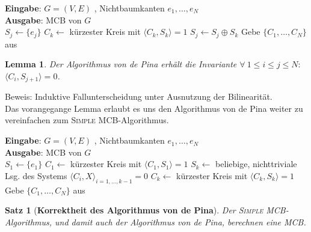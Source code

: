 \documentclass[a4paper,10pt]{scrartcl}
\newcommand{\tbf}{\textbf}
\newcommand{\tsc}{\textsc}
\newcommand{\agn}{\leftarrow}
\newcommand{\Gr}{$G = (V,E)$ }
\newcommand{\Eingabe}[1]{\STATE \tbf{Eingabe}: #1 \\}
\newcommand{\Ausgabe}[1]{\STATE \tbf{Ausgabe}: #1 \\}
\newtheorem{satz}{Satz}
\newtheorem{lemma}{Lemma}
\begin{document}
\begin{algorithm}
\caption{Algorithmus von \textsf{de Pina} algebraisch}
\begin{algorithmic}
\Eingabe{\Gr, Nichtbaumkanten $e_1, \ldots, e_N$}
\Ausgabe{MCB von $G$}
	\STATE $S_j \agn \{e_j\}$
\ENDFOR
{}
	\STATE $C_k \agn$ kürzester Kreis mit $\langle C_k, S_k \rangle = 1$
			\STATE $S_j \agn S_j \oplus S_k$
		\ENDIF
	\ENDFOR
\ENDFOR
\STATE Gebe $\{C_1, \ldots, C_N\}$ aus
\end{algorithmic}
\end{algorithm}

\begin{lemma}\label{PinaInvariante}
 Der Algorithmus von \textsf{de Pina} erhält die Invariante $\forall \ 1 \leq i \leq j \leq N:$ $\langle C_i,S_{j+1} \rangle = 0$.
\end{lemma}

Beweis: Induktive Fallunterscheidung unter Ausnutzung der Bilinearität. \\

Das vorangegange Lemma erlaubt es uns den Algorithmus von \textsf{de Pina} weiter zu vereinfachen zum \tsc{Simple MCB}-Algorithmus. \\

\begin{algorithm}
\caption{\tsc{Simple MCB}}
\begin{algorithmic}
\Eingabe{\Gr, Nichtbaumkanten $e_1, \ldots, e_N$}
\Ausgabe{MCB von $G$}
\STATE $S_1 \agn \{e_1\}$
\STATE $C_1 \agn$ kürzester Kreis mit $\langle C_1, S_1 \rangle = 1$
	\STATE $S_k \agn$ beliebige, nichttriviale Lsg. des Systems $\langle C_i, X \rangle_{i=1,\ldots,k-1} = 0$
	\STATE $C_k \agn$ kürzester Kreis mit $\langle C_k, S_k \rangle = 1$
\ENDFOR
\STATE Gebe $\{C_1, \ldots, C_N\}$ aus
\end{algorithmic}
\end{algorithm}

\begin{satz}[\tbf{Korrektheit des Algorithmus von \textsf{de Pina}}]
 Der \tsc{Simple MCB}-Algorithmus, und damit auch der Algorithmus von \textsf{de Pina}, berechnen eine MCB.
\end{satz}
\end{document}
